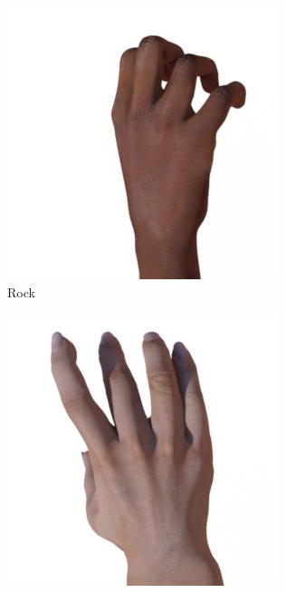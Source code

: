 \begin{figure}[htp]
    \centering
    \begin{subfigure}[t]{0.3\textwidth}
        \centering
        \includegraphics[width=\linewidth]{imagenes/dataset_examples/rock.jpg}
        \caption*{Rock}
    \end{subfigure}
    \begin{subfigure}[t]{0.3\textwidth}
        \centering
        \includegraphics[width=\linewidth]{imagenes/dataset_examples/paper.jpg}

\end{subfigure}
\end{figure}
